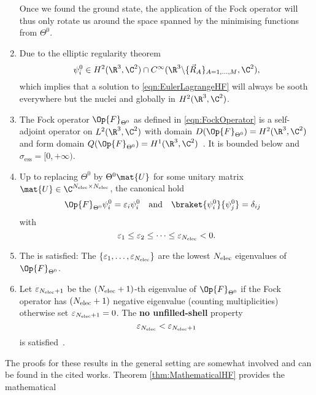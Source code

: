 \begin{thm}
\begin{enumerate}
			Once we found the ground state, the application of the Fock operator
			will thus only rotate us around the space spanned by the minimising
			functions from $\Theta^0$.
		\item Due to the elliptic regularity theorem~\cite{Lieb1977}
			\[ \psi_i^0 \in H^2(\R^3,\C^2) \cap C^\infty(\R^3 \backslash \{\vec{R}_A\}_{A=1,\ldots,M},\C^2), \]
			which implies that a solution to \eqref{eqn:EulerLagrangeHF}
			will always be sooth everywhere but the nuclei and globally in $H^2(\R^3,\C^2)$.
		\item The Fock operator $\Op{F}_{\Theta^0}$ as defined in \eqref{eqn:FockOperator}
			is a self-adjoint operator on $L^2(\R^3,\C^2)$
			with domain $D(\Op{F}_{\Theta^0}) = H^2(\R^3,\C^2)$
			and form domain $Q(\Op{F}_{\Theta^0}) = H^1(\R^3,\C^2)$~\cite{Lions1987}.
			It is bounded below and $\sigma_\text{ess} =[0, +\infty)$.
		\item Up to replacing $\Theta^0$ by $\Theta^0 \mat{U}$
			for some unitary matrix $\mat{U} \in \C^{\Nelec\times\Nelec}$,
			the canonical  hold
			\begin{align}
				\label{eqn:HFequations}
				\Op{F}_{\Theta^0} \psi_i^0 &= \varepsilon_i \psi_i^0
				&&\text{and}&
				\braket{\psi_i^0}{\psi_j^0} &= \delta_{ij}
			\end{align}
			with
			\[ \varepsilon_1 \leq \varepsilon_2 \leq \cdots \leq \varepsilon_{N_\text{elec}} < 0. \]
		\item The  is satisfied:
			The $\{\varepsilon_1, \ldots,\varepsilon_{N_\text{elec}} \}$
			are the lowest $N_\text{elec}$ eigenvalues of $\Op{F}_{\Theta^0}$.
		\item Let $\varepsilon_{N_\text{elec}+1}$ be the $(N_\text{elec}+1)$-th eigenvalue of $\Op{F}_{\Theta^0}$
			if the Fock operator has $(N_\text{elec}+1)$ negative eigenvalue (counting multiplicities)
			otherwise set $\varepsilon_{N_\text{elec}+1} = 0$.
			The \textbf{no unfilled-shell} property
			\[ \varepsilon_{N_\text{elec}} < \varepsilon_{N_\text{elec}+1} \]
			is satisfied~.
	\end{enumerate}
\end{thm}
The proofs for these results in the general setting are somewhat involved
and can be found in the cited works.
Theorem \ref{thm:MathematicalHF} provides the mathematical
